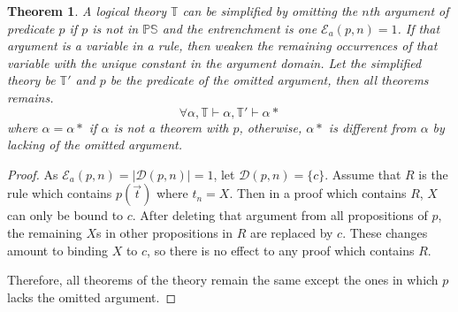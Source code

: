 \documentclass[11pt,letterpaper]{article}
\newtheorem{theorem}{Theorem}[section]
\newcommand{\ps}{\mathbb{PS}}
\newcommand{\theory}{\mathbb{T}}
\begin{document}
\begin{theorem}\label{the:ref:remarg}
A logical theory $\theory$ can be simplified by omitting the $n$th argument of predicate $p$ if $p$ is not in $\ps$ and the entrenchment is one $\mathcal{E}_{a}(p, n)=1$. If that argument is a variable in a rule, then weaken the remaining occurrences of that variable with the unique constant in the argument domain. Let the simplified theory be $\theory'$ and $p$ be the predicate of the omitted argument, then all theorems remains.
\begin{equation}
    \forall \alpha, \theory \vdash \alpha, \theory' \vdash \alpha*
\end{equation}
where $\alpha = \alpha*$ if $\alpha$ is not a theorem with $p$, otherwise, $\alpha*$ is different from $\alpha$ by lacking of the omitted argument.
\end{theorem}

\begin{proof}
As $\mathcal{E}_{a}(p, n) = |\mathcal{D}(p, n)| =  1$, let $\mathcal{D}(p, n) = \{c\}$. Assume that $R$ is the rule which contains $p(\vec{t})$ where $t_n = X$. Then in a proof which contains $R$, $X$ can only be bound to $c$. After deleting that argument from all propositions of $p$, the remaining $X$s in other propositions in $R$ are replaced by $c$. These changes amount to binding $X$ to $c$, so there is no effect to any proof which contains $R$. 

Therefore, all theorems of the theory remain the same except the ones in which $p$ lacks the omitted argument.
\end{proof}
\end{document}
